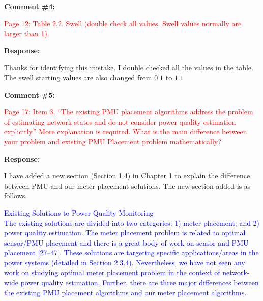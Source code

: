 \documentclass[journal]{IEEEtran}
\begin{document}
\vspace{20pt}
\textbf{Comment \#4:}
\begin{adjustwidth}{2.5em}{0pt}
\singlespacing \vspace{-10pt}
\textcolor{red}{Page 12: Table 2.2. Swell (double check all values. Swell values normally are larger than 1).}
\end{adjustwidth}

\vspace{10pt}
\textbf{Response:}
\begin{adjustwidth}{2.5em}{0pt}
Thanks for identifying this mistake. I double checked all the values in the table. The swell starting values are also changed from $0.1$ to $1.1$
\end{adjustwidth}



\vspace{30pt}
\textbf{Comment \#5:}
\begin{adjustwidth}{2.5em}{0pt}
\singlespacing \vspace{-10pt}
\textcolor{red}{Page 17: Item 3. “The existing PMU placement algorithms address the problem of estimating network states and do not consider power quality estimation explicitly.” More explanation is required. What is the main difference between your problem and existing PMU Placement problem mathematically?}
\end{adjustwidth}

\vspace{10pt}
\textbf{Response:}
\begin{adjustwidth}{2.5em}{0pt}
I have added a new section (Section 1.4) in Chapter 1 to explain the difference between PMU and our meter placement solutions. The new section added is as follows.

\end{adjustwidth}

\vspace{5pt}
\begin{adjustwidth}{2.5em}{0pt}
\noindent\textcolor{blue}{{\Large Existing Solutions to Power Quality Monitoring} \vspace{0.4em} \\
The existing solutions are divided into two categories: 1) meter placement; and 2) power quality estimation. The meter placement problem is related to optimal sensor/PMU placement and there is a great body of work on sensor and PMU placement [27--47]. These solutions are targeting specific applications/areas in the power systems (detailed in Section 2.3.4). Nevertheless, we have not seen any work on studying optimal meter placement problem in the context of network-wide power quality estimation. Further, there are three major differences between the existing PMU placement algorithms and our meter placement algorithms.}\end{adjustwidth}
\end{document}
